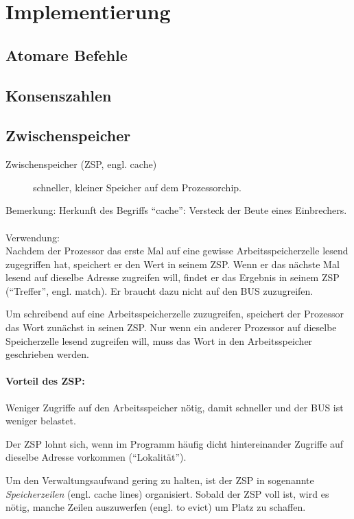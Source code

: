 \chapter{Implementierung}

\section{Atomare Befehle}

\section{Konsenszahlen}



\section{Zwischenspeicher}

\begin{description}
	\item[Zwischenspeicher (ZSP, engl. cache)] schneller, kleiner Speicher auf dem Prozessorchip.
\end{description}
Bemerkung: Herkunft des Begriffs "`cache"': Versteck der Beute eines Einbrechers.\\
\\
Verwendung:\\
Nachdem der Prozessor das erste Mal auf eine gewisse Arbeitsspeicherzelle lesend zugegriffen hat, speichert er den Wert in seinem ZSP. Wenn er das nächste Mal lesend auf dieselbe Adresse zugreifen will, findet er das Ergebnis in seinem ZSP ("`Treffer"', engl. match). Er braucht dazu nicht auf den BUS zuzugreifen.

Um schreibend auf eine Arbeitsspeicherzelle zuzugreifen, speichert der Prozessor das Wort zunächst in seinen ZSP. Nur wenn ein anderer Prozessor auf dieselbe Speicherzelle lesend zugreifen will, muss das Wort in den Arbeitsspeicher geschrieben werden.

\subsubsection*{Vorteil des ZSP:}
Weniger Zugriffe auf den Arbeitsspeicher nötig, damit schneller und der BUS ist weniger belastet.

Der ZSP lohnt sich, wenn im Programm häufig dicht hintereinander Zugriffe auf dieselbe Adresse vorkommen ("`Lokalität"').

Um den Verwaltungsaufwand gering zu halten, ist der ZSP in sogenannte \emph{Speicherzeilen} (engl. cache lines) organisiert. Sobald der ZSP voll ist, wird es nötig, manche Zeilen auszuwerfen (engl. to evict) um Platz zu schaffen.

